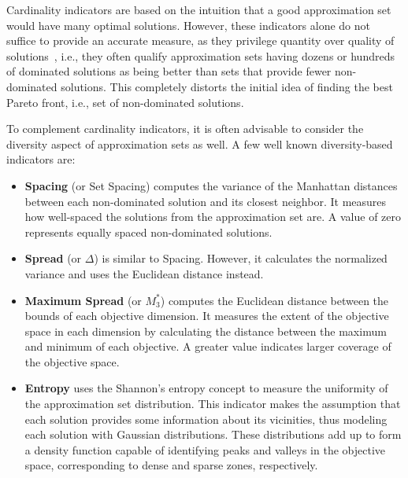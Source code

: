 Cardinality indicators are based on the intuition that a good approximation set would have many optimal solutions. However, these indicators alone do not suffice to provide an accurate measure, as they privilege quantity over quality of solutions~\cite{Veldhuizen1999GD}, i.e., they often qualify approximation sets having dozens or hundreds of dominated solutions as being better than sets that provide fewer non-dominated solutions. This completely distorts the initial idea of finding the best Pareto front, i.e., set of non-dominated solutions.

To complement cardinality indicators, it is often advisable to consider the diversity aspect of approximation sets as well. A few well known diversity-based indicators are:
\begin{itemize}
\item  \textbf{Spacing} (or Set Spacing) computes the variance of the Manhattan distances between each non-dominated solution and its closest neighbor. It measures how well-spaced the solutions from the approximation set are. A value of zero represents equally spaced non-dominated solutions. 
\item \textbf{Spread} (or $\Delta$) is similar to Spacing. However, it calculates the normalized variance and uses the Euclidean distance instead.
\item \textbf{Maximum Spread} (or \textbf{$M_3^\ast$}) computes the Euclidean distance between the bounds of each objective dimension. It measures the extent of the objective space in each dimension by calculating the distance between the maximum and minimum of each objective. A greater value indicates larger coverage of the objective space.

\item \textbf{Entropy} uses the Shannon's entropy concept to measure the uniformity of the approximation set distribution. This indicator makes the assumption that each solution provides some information about its vicinities, thus modeling each solution with Gaussian distributions. These distributions add up to form a density function capable of identifying peaks and valleys in the objective space, corresponding to dense and sparse zones, respectively. 


\end{itemize}
